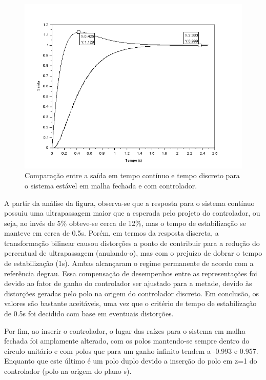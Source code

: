 \begin{figure}[H]
\begin{center}
\includegraphics[width=12cm]{images/mf/mf_estavel.png}
\caption{Comparação entre a saída em tempo contínuo e tempo discreto para o sistema estável em malha fechada e com controlador.}
\label{mf:1} 
\end{center}
\end{figure}

A partir da análise da figura, observa-se que a resposta para o sistema contínuo possuiu uma ultrapassagem maior que a esperada pelo projeto do controlador, ou seja, ao invés de  5\% obteve-se cerca de 12\%, mas o tempo de estabilização se manteve em cerca de 0.5s. Porém, em termos da resposta discreta, a transformação bilinear causou distorções a ponto de contribuir para a redução do percentual de ultrapassagem (anulando-o), mas com o prejuízo de dobrar o tempo de estabilização (1s). Ambas alcançaram o regime permanente de acordo com a referência degrau. Essa compensação de desempenhos entre as representações foi devido ao fator de ganho do controlador ser ajustado para a metade, devido às distorções geradas pelo polo na origem do controlador discreto. Em conclusão, os valores são bastante aceitáveis, uma vez que o critério de tempo de estabilização de 0.5s foi decidido com base em eventuais distorções.

Por fim, ao inserir o controlador, o lugar das raízes para o sistema em malha fechada foi amplamente alterado, com os polos mantendo-se sempre dentro do círculo unitário e com polos que para um ganho infinito tendem a -0.993 e 0.957. Enquanto que este último é um polo duplo devido a inserção do polo em z=1 do controlador (polo na origem do plano s).

